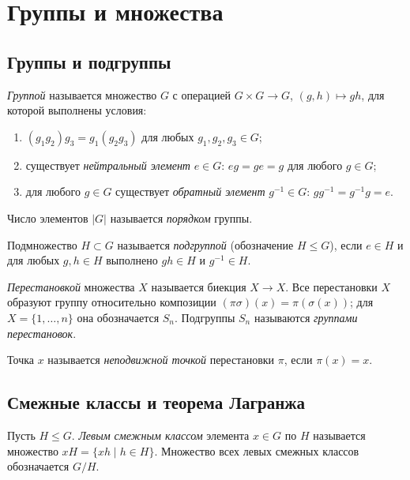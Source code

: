 \documentclass[12pt]{article}
\begin{document}
	\section{Группы и множества}

	\subsection{Группы и подгруппы}

	\begin{definition}[Группа]\label{def:group}
		\emph{Группой} называется множество $G$ с операцией $G \times G \to G$, $(g, h) \mapsto gh$, для которой выполнены условия:
		\begin{enumerate}
			\item $(g_1g_2)g_3 = g_1(g_2g_3)$ для любых $g_1, g_2, g_3 \in G$;
			\item существует \emph{нейтральный элемент} $e \in G$: $eg = ge = g$ для любого $g \in G$;
			\item для любого $g \in G$ существует \emph{обратный элемент} $g^{-1} \in G$: $gg^{-1} = g^{-1}g = e$.
		\end{enumerate}
		Число элементов $|G|$ называется \emph{порядком} группы.
	\end{definition}

	\begin{definition}[Подгруппа]
		Подмножество $H \subset G$ называется \emph{подгруппой} (обозначение $H \leqslant G$), если $e \in H$ и для любых $g, h \in H$ выполнено $gh \in H$ и $g^{-1} \in H$.
	\end{definition}

	\begin{definition}\label{def:perm-group}
		\emph{Перестановкой} множества $X$ называется биекция $X \to X$. Все перестановки $X$ образуют группу относительно композиции $(\pi\sigma)(x) = \pi(\sigma(x))$; для $X = \{1, \dots, n\}$ она обозначается $S_n$. Подгруппы $S_n$ называются \emph{группами перестановок}.

		Точка $x$ называется \emph{неподвижной точкой} перестановки $\pi$, если $\pi(x) = x$.
	\end{definition}

	\subsection{Смежные классы и теорема Лагранжа}

	\begin{definition}
		Пусть $H \leqslant G$. \emph{Левым смежным классом} элемента $x \in G$ по $H$ называется множество $xH = \{ xh \mid h \in H \}$. Множество всех левых смежных классов обозначается $G/H$.
	\end{definition}
\end{document}
